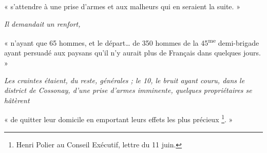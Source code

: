 \documentclass[french,twoside]{book} %
\newenvironment{quoteblock}%
  {\begin{quoting}}
  {\end{quoting}}
\newenvironment{quotebar}{%
    \def\FrameCommand{{\color{rubric!10!}\vrule width 0.5em} \hspace{0.9em}}%
    \def\OuterFrameSep{\itemsep} %
    \MakeFramed {\advance\hsize-\width \FrameRestore}
  }%
  {%
    \endMakeFramed
  }
\renewenvironment{quoteblock}%
  {%
    \savenotes
    \setstretch{0.9}
    \begin{quotebar}
  }
  {%
    \end{quotebar}
    \spewnotes
  }
\begin{document}
\begin{quoteblock}
 \noindent « s’attendre à une prise d’armes et aux malheurs qui en seraient la suite. »\par
 \emph{Il demandait un renfort,}\par
 « n’ayant que 65 hommes, et le départ… de 350 hommes de la 45\textsuperscript{me} demi-brigade ayant persuadé aux paysans qu’il n’y aurait plus de Français dans quelques jours. »\par
 \emph{Les craintes étaient, du reste, générales ; le 10, le bruit ayant couru, dans le district de Cossonay, d’une prise d’armes imminente, quelques propriétaires se hâtèrent}\par
 « de quitter leur domicile en emportant leurs effets les plus précieux \footnote{Henri Polier au Conseil Exécutif, lettre du 11 juin.}. »
 \end{quoteblock}
\end{document}
